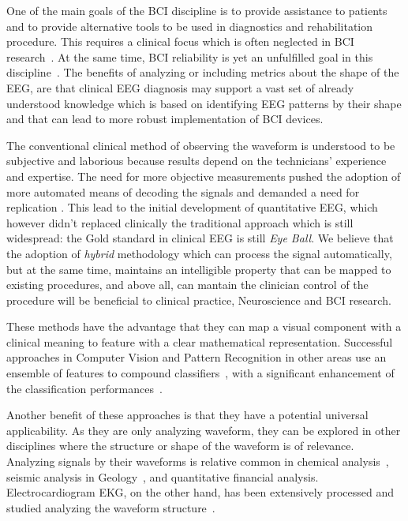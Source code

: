 \documentclass[brainsci,article,submit,moreauthors,pdftex,10pt,a4paper]{mdpi}
\begin{document}
One of the main goals of the BCI discipline is to provide assistance to patients and to provide alternative tools to be used in diagnostics and rehabilitation procedure.  This requires a clinical focus which is often neglected in BCI research~\citep{Chavarriaga2017}.  At the same time, BCI reliability is yet an unfulfilled goal in this discipline~\citep{WolpawJonathanR2012}. The benefits of analyzing or including metrics about the shape of the EEG, are that clinical EEG diagnosis may support a vast set of already understood knowledge which is based on identifying EEG patterns by their shape and that can lead to more robust implementation of BCI devices.

The conventional clinical method of observing the waveform is understood to be subjective and laborious because results depend on the technicians' experience and expertise.  The need for more objective measurements pushed the adoption of more automated means of decoding the signals and demanded a need for replication \citep{Thakor2004}.  This lead to the initial development of quantitative EEG, which however didn't replaced clinically the traditional approach which is still widespread: the Gold standard in clinical EEG is still \textit{Eye Ball}.  We believe that the adoption of \textit{hybrid} methodology which can process the signal automatically, but at the same time, maintains an intelligible property that can be mapped to existing procedures, and above all, can mantain the clinician control of the procedure will be beneficial to clinical practice, Neuroscience and BCI research. 

These methods have the advantage that they can map a visual component with a clinical meaning to feature with a clear mathematical representation.  Successful approaches in Computer Vision and Pattern Recognition in other areas use an ensemble of features to compound classifiers~\citep{Criminisi2013}, with a significant enhancement of the classification performances~\citep{Gu2012}.

Another benefit of these approaches is that they have a potential universal applicability.  As they are only analyzing waveform, they can be explored in other disciplines where the structure or shape of the waveform is of relevance.  Analyzing signals by their waveforms is relative common in chemical analysis~\citep{Skoog2000}, seismic analysis in Geology~\citep{Owens1984}, and quantitative financial analysis.  Electrocardiogram EKG, on the other hand, has been extensively processed and studied analyzing the waveform structure~\citep{Stockman1976}.
\end{document}
